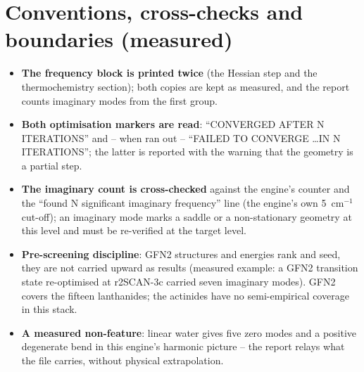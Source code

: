 \section{Conventions, cross-checks and boundaries (measured)}

\begin{readbox}
\begin{itemize}
  \item \textbf{The frequency block is printed twice} (the Hessian step and
    the thermochemistry section); both copies are kept as measured, and
    the report counts imaginary modes from the first group.
  \item \textbf{Both optimisation markers are read}: ``CONVERGED AFTER N
    ITERATIONS'' and -- when  ran out -- ``FAILED TO
    CONVERGE \ldots IN N ITERATIONS''; the latter is reported with the
    warning that the geometry is a partial step.
  \item \textbf{The imaginary count is cross-checked} against the engine's
     counter and the ``found N significant
    imaginary frequency'' line (the engine's own 5~cm$^{-1}$ cut-off); an
    imaginary mode marks a saddle or a non-stationary geometry at this
    level and must be re-verified at the target level.
  \item \textbf{Pre-screening discipline}: GFN2 structures and energies
    rank and seed, they are not carried upward as results (measured
    example: a GFN2 transition state re-optimised at r2SCAN-3c carried
    seven imaginary modes).  GFN2 covers the fifteen lanthanides; the
    actinides have no semi-empirical coverage in this stack.
  \item \textbf{A measured non-feature}: linear water gives five zero
    modes and a positive degenerate bend in this engine's harmonic
    picture -- the report relays what the file carries, without physical
    extrapolation.
\end{itemize}
\end{readbox}
